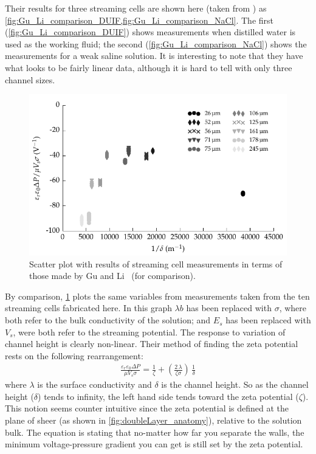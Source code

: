     Their results for three streaming cells are shown here (taken from \cite{Gu2000}) as \cref{fig:Gu_Li_comparison_DUIF,fig:Gu_Li_comparison_NaCl}.
    The first (\cref{fig:Gu_Li_comparison_DUIF}) shows measurements when distilled water is used as the working fluid; the second (\cref{fig:Gu_Li_comparison_NaCl}) shows the measurements for a weak saline solution.
    It is interesting to note that they have what looks to be fairly linear data, although it is hard to tell with only three channel sizes.

    \begin{figure}
        \centering
        \includegraphics{content/pt1/01-PowerHarvesting/graphics/graph_streamingComparison_gu}
        \caption{\label{fig:streamingCell_scatter_Gu_Li}Scatter plot with results of streaming cell measurements in terms of those made by Gu and Li~\cite{Gu2000} (for comparison).}
    \end{figure}

    By comparison, \cref{fig:streamingCell_scatter_Gu_Li} plots the same variables from measurements taken from the ten streaming cells fabricated here.
    In this graph $\lambda{b}$ has been replaced with $\sigma$, where both refer to the bulk conductivity of the solution; and $E_{s}$ has been replaced with $V_{s}$, were both refer to the streaming potential.
    The response to variation of channel height is clearly non-linear.
    Their method of finding the zeta potential rests on the following rearrangement:
    \begin{eqnarray}
        \frac{\varepsilon_{r}\varepsilon_{0}\Delta P}{\mu V_{s}\sigma} = \frac{1}{\zeta} + \left( \frac{2\,\lambda}{\zeta \sigma}\right)\,\frac{1}{\delta}
    \end{eqnarray}
    where $\lambda$ is the surface conductivity and $\delta$ is the channel height.
    So as the channel height ($\delta$) tends to infinity, the left hand side tends toward the zeta potential ($\zeta$).
    This notion seems counter intuitive since the zeta potential is defined at the plane of sheer (as shown in \cref{fig:doubleLayer_anatomy}), relative to the solution bulk.
    The equation is stating that no-matter how far you separate the walls, the minimum voltage-pressure gradient you can get is still set by the zeta potential.

